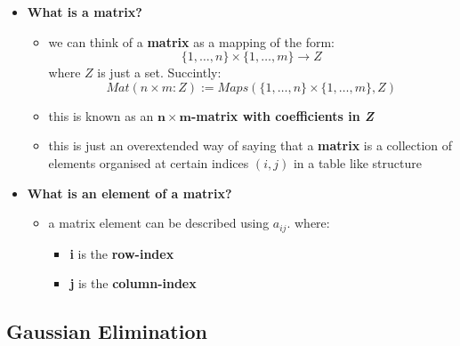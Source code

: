 \documentclass{exam}
\begin{document}
\begin{itemize}
    \item \textbf{What is a matrix?}
    \begin{itemize}
        \item we can think of a \textbf{matrix} as a mapping of the form:
        \[
        \{1, \ldots, n\} \times \{1, \ldots, m\} \to Z
        \]
        where $Z$ is just a set. Succintly:
        \[
        Mat(n \times m: Z) := Maps( \{1, \ldots, n\} \times \{1, \ldots, m\}, Z)
        \]
        \item this is known as an $\boldsymbol{n \times m}$\textbf{-matrix with coefficients in \textit{Z}}
        \item this is just an overextended way of saying that a \textbf{matrix} is a collection of elements organised at certain indices $(i,j)$ in a table like structure
    \end{itemize}
    \item \textbf{What is an element of a matrix?}
    \begin{itemize}
        \item a matrix element can be described using $a_{ij}$. where:
        \begin{itemize}
            \item \textbf{i} is the \textbf{row-index}
            \item \textbf{j} is the \textbf{column-index}
        \end{itemize}
    \end{itemize}
\end{itemize}

\subsection{Gaussian Elimination}
\end{document}
